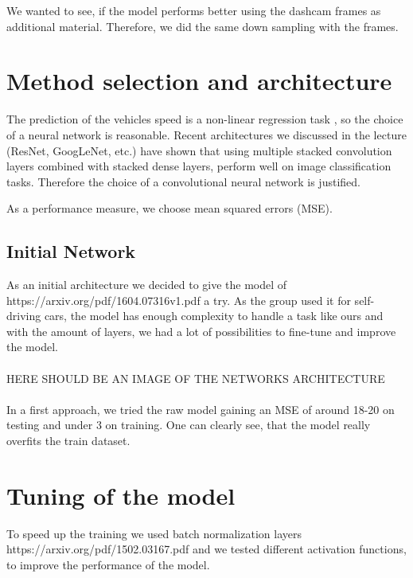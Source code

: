 \documentclass[conference]{IEEEtran}
\begin{document}
We wanted to see, if the model performs better using the dashcam frames as additional material. Therefore, we did the same down 
sampling with the frames.


\section{Method selection and architecture}
The prediction of the vehicles speed is a non-linear regression task , so the choice of a neural network is reasonable. 
Recent architectures we discussed in the lecture (ResNet, GoogLeNet, etc.) have shown that using multiple stacked convolution layers
combined with stacked dense layers, perform well on image classification tasks. Therefore the choice of a convolutional neural 
network is justified.

As a performance measure, we choose mean squared errors (MSE).

\subsection{Initial Network}

As an initial architecture we decided to give the model of https://arxiv.org/pdf/1604.07316v1.pdf a try. As the group used it
for self-driving cars, the model has enough complexity to handle a task like ours and with the amount of layers, we had a lot of
possibilities to fine-tune and improve the model.\\
\\HERE SHOULD BE AN IMAGE OF THE NETWORKS ARCHITECTURE\\
\\In a first approach, we tried the raw model gaining an MSE of around 18-20 on testing and under 3 on training. One can clearly 
see, that the model really overfits the train dataset.

\section{Tuning of the model}
To speed up the training we used batch normalization layers https://arxiv.org/pdf/1502.03167.pdf and we tested different activation functions, to improve the performance of the model. 
\end{document}
